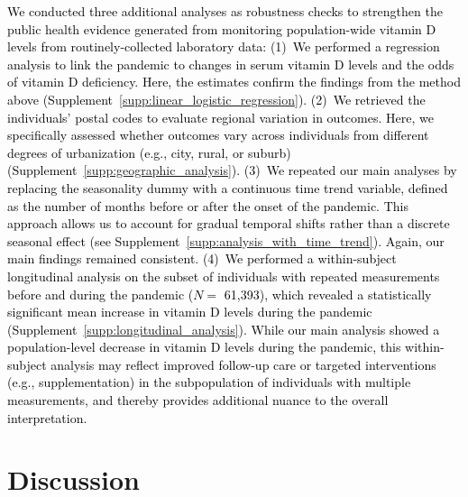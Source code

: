 \documentclass[12pt]{article}
\newcommand{\REV}[1]{\textcolor{black}{#1}}
\begin{document}
\REV{We conducted three additional analyses as robustness checks to strengthen the public health evidence generated from monitoring population-wide vitamin D levels from routinely-collected laboratory data: (1)~We performed a regression analysis to link the pandemic to changes in serum vitamin D levels and the odds of vitamin D deficiency. Here, the estimates confirm the findings from the method above (Supplement~\ref{supp:linear_logistic_regression}). (2)~We retrieved the individuals' postal codes to evaluate regional variation in outcomes. Here, we specifically assessed whether outcomes vary across individuals from different degrees of urbanization (e.g., city, rural, or suburb) (Supplement~\ref{supp:geographic_analysis}). (3)~We repeated our main analyses by replacing the seasonality dummy with a continuous time trend variable, defined as the number of months before or after the onset of the pandemic. This approach allows us to account for gradual temporal shifts rather than a discrete seasonal effect (see Supplement~\ref{supp:analysis_with_time_trend}). Again, our main findings remained consistent. (4)~We performed a within-subject longitudinal analysis on the subset of individuals with repeated measurements before and during the pandemic ($N =$ 61,393), which revealed a statistically significant mean increase in vitamin D levels during the pandemic (Supplement~\ref{supp:longitudinal_analysis}). While our main analysis showed a population-level decrease in vitamin D levels during the pandemic, this within-subject analysis may reflect improved follow-up care or targeted interventions (e.g., supplementation) in the subpopulation of individuals with multiple measurements, and thereby provides additional nuance to the overall interpretation.}

\newpage

\section*{Discussion}
\label{sec:discussion}

\end{document}

